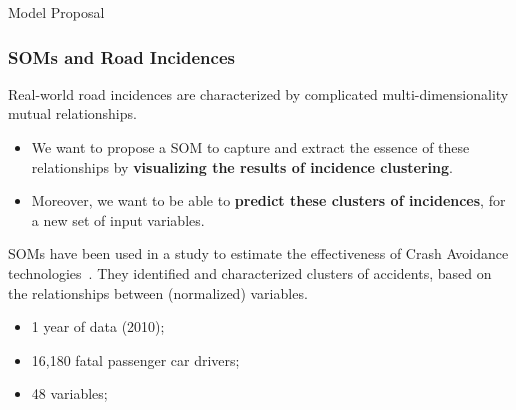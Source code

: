 \documentclass[hyperref={pdfpagelabels=true}]{beamer}
\begin{document}
\begin{frame}
\huge
{ \centering
Model Proposal}
\end{frame}

\begin{frame}
\frametitle{SOMs and Road Incidences}
Real-world road incidences are characterized by complicated multi-dimensionality mutual relationships.
\begin{itemize}
\item We want to propose a SOM to capture and extract the essence of these relationships by \textbf{visualizing the results of incidence clustering}.
\item Moreover, we want to be able to \textbf{predict these clusters of incidences}, for a new set of input variables.
\end{itemize}
SOMs have been used in a study to estimate the effectiveness of Crash Avoidance technologies~\cite{crash}. They identified and characterized clusters of accidents, based on the relationships between (normalized) variables.
\begin{itemize}
\item <2-> 1 year of data (2010);
\item <3-> 16,180 fatal passenger car drivers;
\item <4-> 48 variables;
\end{itemize}
\end{frame}
\end{document}
